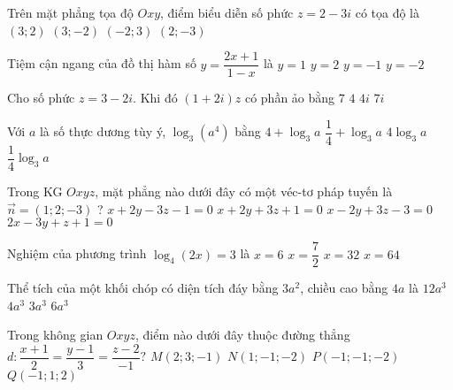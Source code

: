 \begin{ex}%
Trên mặt phẳng tọa độ $Oxy$, điểm biểu diễn số phức $z=2-3 i$ có tọa độ là
\choice
{$(3 ; 2)$}
{$(3 ;-2)$}
{$(-2 ; 3)$}
{\True $(2 ;-3)$}
\end{ex}
\begin{ex}%
Tiệm cận ngang của đồ thị hàm số $y=\dfrac{2 x+1}{1-x}$ là
\choice
{ $y=1$}
{$y=2$}
{$y=-1$}
{\True $y=-2$}
\end{ex}
\begin{ex}%
Cho số phức $z=3-2i$. Khi đó $(1+2i)z$ có phần ảo bằng
\choice
{$7$}
{$4$}
{\True $4i$}
{$7i$}
\end{ex}
\begin{ex}%
Với $a$ là số thực dương tùy ý, $\log _3\left(a^4\right)$ bằng
\choice
{$4+\log _3 a$}
{$\dfrac{1}{4}+\log _3 a$}
{\True $4 \log _3 a$}
{$\dfrac{1}{4} \log _3 a$}
\end{ex}
\begin{ex}%
Trong KG $Oxyz$, mặt phẳng nào dưới đây có một véc-tơ pháp tuyến là $\vec{n}=(1 ; 2 ;-3)$ ?
\choice
{\True $x+2y-3z-1=0$}
{$x+2y+3z+1=0$}
{$x-2y+3z-3=0$}
{$2x-3y+z+1=0$}
\end{ex}
\begin{ex}%
Nghiệm của phương trình $\log _4(2 x)=3$ là
\choice
{$x=6$}
{$x=\dfrac{7}{2}$}
{\True $x=32$}
{$x=64$}
\end{ex}
\begin{ex}%
	Thể tích của một khối chóp có diện tích đáy bằng $3a^2$, chiều cao bằng $4a$ là
	\choice
	{ $12 a^3$}
	{\True $4 a^3$}
	{$3 a^3$}
	{$6 a^3$}
\end{ex}
\begin{ex}%
	Trong không gian $O x y z$, điểm nào dưới đây thuộc đường thẳng $d: \dfrac{x+1}{2}=\dfrac{y-1}{3}=\dfrac{z-2}{-1} ?$
	\choice
	{$M(2 ; 3 ;-1)$}
	{$N(1 ;-1 ;-2)$}
	{$P(-1 ;-1 ;-2)$}
	{\True $Q(-1 ; 1 ; 2)$}
\end{ex}
